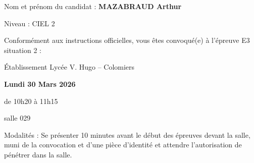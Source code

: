 \vfill

Nom et prénom du candidat : {\large \bf MAZABRAUD Arthur}\sautp

Niveau : CIEL 2

\vfill

Conformément aux instructions officielles, vous êtes convoqué(e) à l’épreuve E3 situation 2 :\sautp

\begin{center}
Établissement Lycée V. Hugo -- Colomiers \sautp

\large \bf Lundi 30 Mars 2026\sautb

de 10h20 à 11h15\sautb

salle 029
\end{center}

\vfill 

Modalités : Se présenter 10 minutes avant le début des épreuves devant la salle, muni
de la convocation et d’une pièce d’identité et attendre l’autorisation de pénétrer dans la
salle.

\vfill

\vfill ~


